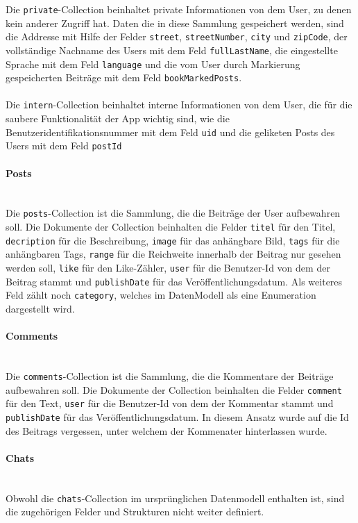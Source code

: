 Die \texttt{private}-Collection beinhaltet private Informationen von dem User, zu denen kein anderer Zugriff hat. Daten die in diese Sammlung gespeichert werden, sind die Addresse mit Hilfe der Felder \texttt{street}, \texttt{streetNumber}, \texttt{city} und \texttt{zipCode}, der vollständige Nachname des Users mit dem Feld \texttt{fullLastName}, die eingestellte Sprache mit dem Feld \texttt{language} und die vom User durch Markierung gespeicherten Beiträge mit dem Feld \texttt{bookMarkedPosts}.
\\\\
Die \texttt{intern}-Collection beinhaltet interne Informationen von dem User, die für die saubere Funktionalität der App wichtig sind, wie die Benutzeridentifikationsnummer mit dem Feld \texttt{uid} und die geliketen Posts des Users mit dem Feld \texttt{postId}

\paragraph{Posts}\mbox{} \\
Die \texttt{posts}-Collection ist die Sammlung, die die Beiträge der User aufbewahren soll. Die Dokumente der Collection beinhalten die Felder \texttt{titel} für den Titel, \texttt{decription} für die Beschreibung, \texttt{image} für das anhängbare Bild, \texttt{tags} für die anhängbaren Tags, \texttt{range} für die Reichweite innerhalb der Beitrag nur gesehen werden soll, \texttt{like} für den Like-Zähler, \texttt{user} für die Benutzer-Id von dem der Beitrag stammt und \texttt{publishDate} für das Veröffentlichungsdatum. Als weiteres Feld zählt noch \texttt{category}, welches im DatenModell als eine Enumeration dargestellt wird.

\paragraph{Comments}\mbox{} \\
Die \texttt{comments}-Collection ist die Sammlung, die die Kommentare der Beiträge aufbewahren soll. Die Dokumente der Collection beinhalten die Felder \texttt{comment} für den Text, \texttt{user} für die Benutzer-Id von dem der Kommentar stammt und \texttt{publishDate} für das Veröffentlichungsdatum. In diesem Ansatz wurde auf die Id des Beitrags vergessen, unter welchem der Kommenater hinterlassen wurde.

\paragraph{Chats}\mbox{} \\
Obwohl die \texttt{chats}-Collection im ursprünglichen Datenmodell enthalten ist, sind die zugehörigen Felder und Strukturen nicht weiter definiert.

